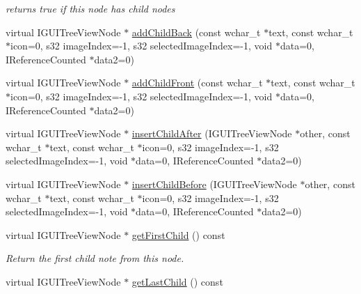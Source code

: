 \begin{DoxyCompactItemize}
\begin{DoxyCompactList}\small\item\em returns true if this node has child nodes \end{DoxyCompactList}\item 
virtual I\-G\-U\-I\-Tree\-View\-Node $\ast$ \hyperlink{classirr_1_1gui_1_1_c_g_u_i_tree_view_node_aec083351abb7b8620ed17ab185403e10}{add\-Child\-Back} (const wchar\-\_\-t $\ast$text, const wchar\-\_\-t $\ast$icon=0, s32 image\-Index=-\/1, s32 selected\-Image\-Index=-\/1, void $\ast$data=0, I\-Reference\-Counted $\ast$data2=0)
\item 
virtual I\-G\-U\-I\-Tree\-View\-Node $\ast$ \hyperlink{classirr_1_1gui_1_1_c_g_u_i_tree_view_node_a4d9f7b824600032c12186f6bbb32b784}{add\-Child\-Front} (const wchar\-\_\-t $\ast$text, const wchar\-\_\-t $\ast$icon=0, s32 image\-Index=-\/1, s32 selected\-Image\-Index=-\/1, void $\ast$data=0, I\-Reference\-Counted $\ast$data2=0)
\item 
virtual I\-G\-U\-I\-Tree\-View\-Node $\ast$ \hyperlink{classirr_1_1gui_1_1_c_g_u_i_tree_view_node_a4c2e1594da077b3ccd2bc6a03388040d}{insert\-Child\-After} (I\-G\-U\-I\-Tree\-View\-Node $\ast$other, const wchar\-\_\-t $\ast$text, const wchar\-\_\-t $\ast$icon=0, s32 image\-Index=-\/1, s32 selected\-Image\-Index=-\/1, void $\ast$data=0, I\-Reference\-Counted $\ast$data2=0)
\item 
virtual I\-G\-U\-I\-Tree\-View\-Node $\ast$ \hyperlink{classirr_1_1gui_1_1_c_g_u_i_tree_view_node_ada5c062585177c2ff59a87f199567d03}{insert\-Child\-Before} (I\-G\-U\-I\-Tree\-View\-Node $\ast$other, const wchar\-\_\-t $\ast$text, const wchar\-\_\-t $\ast$icon=0, s32 image\-Index=-\/1, s32 selected\-Image\-Index=-\/1, void $\ast$data=0, I\-Reference\-Counted $\ast$data2=0)
\item 
\hypertarget{classirr_1_1gui_1_1_c_g_u_i_tree_view_node_a06c83fee42a0dd5f7a6fd02ba77d99c3}{virtual I\-G\-U\-I\-Tree\-View\-Node $\ast$ \hyperlink{classirr_1_1gui_1_1_c_g_u_i_tree_view_node_a06c83fee42a0dd5f7a6fd02ba77d99c3}{get\-First\-Child} () const }\label{classirr_1_1gui_1_1_c_g_u_i_tree_view_node_a06c83fee42a0dd5f7a6fd02ba77d99c3}

\begin{DoxyCompactList}\small\item\em Return the first child note from this node. \end{DoxyCompactList}\item 
\hypertarget{classirr_1_1gui_1_1_c_g_u_i_tree_view_node_a0143cdd786983289613feb496b472fe0}{virtual I\-G\-U\-I\-Tree\-View\-Node $\ast$ \hyperlink{classirr_1_1gui_1_1_c_g_u_i_tree_view_node_a0143cdd786983289613feb496b472fe0}{get\-Last\-Child} () const }\label{classirr_1_1gui_1_1_c_g_u_i_tree_view_node_a0143cdd786983289613feb496b472fe0}


\end{DoxyCompactItemize}

